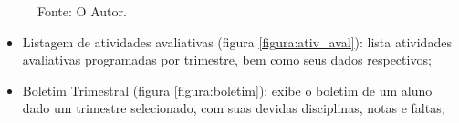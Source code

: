 \begin{figure}[H]
\begin{minipage}[b]{0.45\linewidth}
    	\label{figura:grade}
    	\captionsetup{singlelinecheck = false, format= hang, justification=raggedright, labelsep=space, width=6.5cm}
    	\caption*{\footnotesize Fonte: O Autor.}
    \end{minipage}
\end{figure}

\begin{itemize}
	\item Listagem de atividades avaliativas (figura \ref{figura:ativ_aval}): lista atividades avaliativas programadas por trimestre, bem como seus dados respectivos;
	\item Boletim Trimestral (figura \ref{figura:boletim}): exibe o boletim de um aluno dado um trimestre selecionado, com suas devidas disciplinas, notas e faltas;
\end{itemize}

